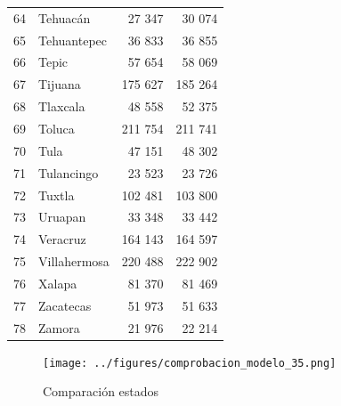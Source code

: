 \documentclass[]{article}
\begin{document}
\begin{table}[H]
\begin{tabular}{rlrr}
  64 & Tehuacán & 27 347 & 30 074 \\ 
  65 & Tehuantepec & 36 833 & 36 855 \\ 
  66 & Tepic & 57 654 & 58 069 \\ 
  67 & Tijuana & 175 627 & 185 264 \\ 
  68 & Tlaxcala & 48 558 & 52 375 \\ 
  69 & Toluca & 211 754 & 211 741 \\ 
  70 & Tula & 47 151 & 48 302 \\ 
  71 & Tulancingo & 23 523 & 23 726 \\ 
  72 & Tuxtla & 102 481 & 103 800 \\ 
  73 & Uruapan & 33 348 & 33 442 \\ 
  74 & Veracruz & 164 143 & 164 597 \\ 
  75 & Villahermosa & 220 488 & 222 902 \\ 
  76 & Xalapa & 81 370 & 81 469 \\ 
  77 & Zacatecas & 51 973 & 51 633 \\ 
  78 & Zamora & 21 976 & 22 214 \\ 
   \hline
\end{tabular}
\endgroup
\end{table}

\begin{figure}[htbp]
\centering
\texttt{[image: ../figures/comprobacion\_modelo\_35.png]}
\caption{Comparación estados}
\end{figure}
\end{document}
